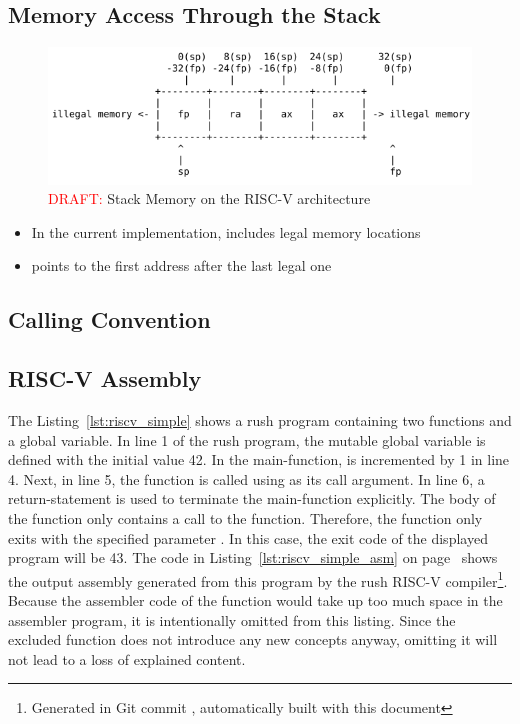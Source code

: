 
\subsection{Memory Access Through the Stack}

\begin{figure}[h]
	\includegraphics[width=\textwidth]{./riscv_stack_draft.png}
	\caption{\textcolor{red}{DRAFT:} Stack Memory on the RISC-V architecture}\label{fig:riscv_stack}
\end{figure}

\begin{itemize}
	\item In the current implementation,  includes legal memory locations
	\item {} points to the first address after the last legal one
\end{itemize}

\subsection{Calling Convention}


\subsection{RISC-V Assembly}

The Listing~\ref{lst:riscv_simple} shows a rush program containing two functions and a global variable.
In line 1 of the rush program, the mutable global variable  is defined with the initial value 42.
In the main-function,  is incremented by 1 in line 4.
Next, in line 5, the  function is called using  as its call argument.
In line 6, a return-statement is used to terminate the main-function explicitly.
The body of the  function only contains a call to the  function.
Therefore, the  function only exits with the specified parameter .
In this case, the exit code of the displayed program will be 43.
The code in Listing~\ref{lst:riscv_simple_asm} on page~\pageref{lst:riscv_simple_asm} shows the output assembly generated from this program by the rush RISC-V compiler\footnote{Generated in Git commit \rushCommit, automatically built with this document}.
Because the assembler code of the  function would take up too much space in the assembler program, it is intentionally omitted from this listing.
Since the excluded function does not introduce any new concepts anyway, omitting it will not lead to a loss of explained content.

